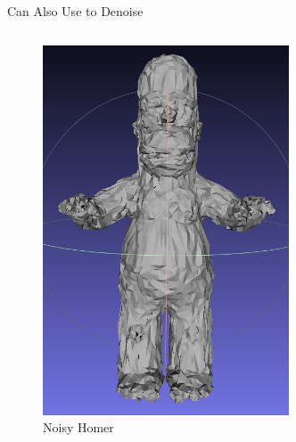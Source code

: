 \documentclass{beamer}
\begin{document}
\begin{frame}{Can Also Use to Denoise}


\begin{columns}
\begin{column}[T]{5cm}
\begin{figure}[t]
    \includegraphics[width=0.8\textwidth]{NoisyHomer.png}
    \caption*{Noisy Homer}
\end{figure}
\end{column}
\begin{column}[T]{5cm}
\begin{figure}[t]

\end{figure}
\end{column}
\end{columns}
\end{frame}
\end{document}
